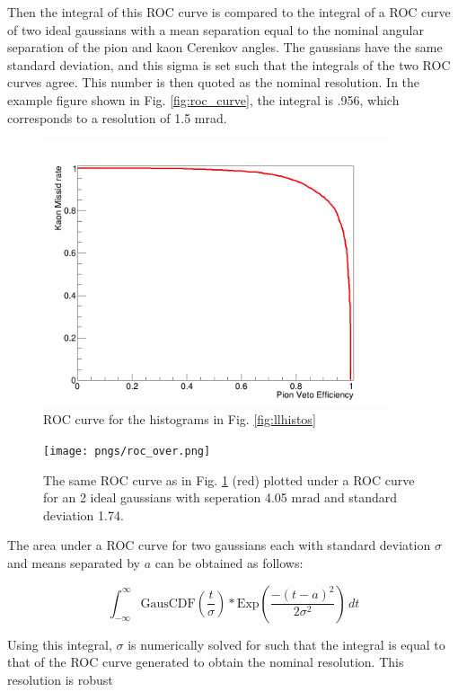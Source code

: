 \documentclass[11pt]{article}
\begin{document}
Then the integral of this ROC curve is compared to the integral of a ROC curve of two ideal gaussians with a mean separation equal to the nominal angular separation of the pion and kaon Cerenkov angles. The gaussians have the same standard deviation, and this sigma is set such that the integrals of the two ROC curves agree.  This number is then quoted as the nominal resolution.  In the example figure shown in Fig. \ref{fig:roc_curve}, the integral is .956, which corresponds to a resolution of 1.5 mrad.
\begin{figure}
\centering
\includegraphics[width=4in]{pngs/roc_curve.png}
\caption{ROC curve for the histograms in Fig. \ref{fig:llhistos} \label{fig:roccurve}}
\end{figure}
\begin{figure}
\centering
\texttt{[image: pngs/roc\_over.png]}
\caption{The same ROC curve as in Fig. \ref{fig:roccurve} (red) plotted under a ROC curve for an 2 ideal gaussians with seperation 4.05 mrad and standard deviation 1.74. \label{fig:roccurve_over}}
\end{figure}

The area under a ROC curve for two gaussians each with standard deviation $\sigma$ and means separated by $a$ can be obtained as follows:

\begin{equation}
\int_{-\infty}^{\infty} \textrm{GausCDF}(\frac{t}{\sigma})*\textrm{Exp}(\frac{-(t-a)^2}{2\sigma^2})\,dt
\end{equation}

Using this integral, $\sigma$ is numerically solved for such that the integral is equal to that of the ROC curve generated to obtain the nominal resolution.  This resolution is robust 
\end{document}
